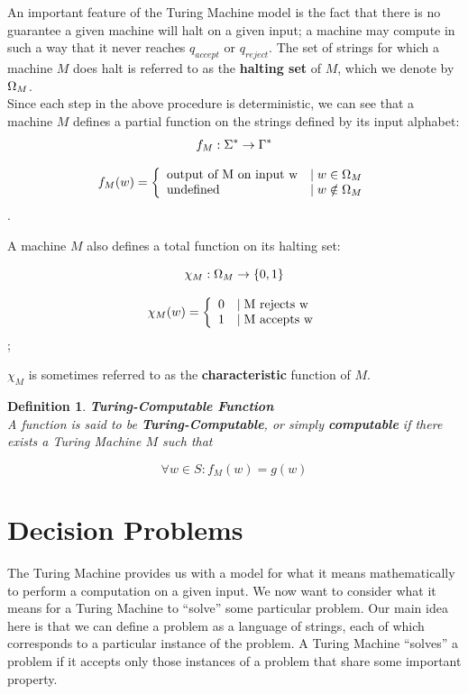 \documentclass{article}
\newtheorem{definition}{Definition}[section]
\begin{document}
An important feature of the Turing Machine model is the fact that
there is no guarantee a given machine will halt on a given input; a
machine may compute in such a way that it never reaches $q_{accept}$
or $q_{reject}$. The set of strings for which a machine $M$ does halt
is referred to as the \textbf{halting set} of $M$, which we denote
by $\Omega_M$.\\

Since each step in the above procedure is deterministic, we can see
that a machine $M$ defines a partial function on the strings
defined by its input alphabet:
$$f_M:\Sigma^* \rightarrow \Gamma^*$$

$$f_M(w) = \left\{ \begin{array}{ll} \textnormal{output of M on input w} & \mid w \in \Omega_M \\ \textnormal{undefined} & \mid w \notin \Omega_M \end{array} \right.$$.
\newline

A machine $M$ also defines a total function on its halting set:

$$\chi_M:\Omega_M \rightarrow \{0,1\}$$

$$\chi_M(w) = \left\{ \begin{array}{ll} 0 & \mid \textnormal{M rejects w} \\ 1 & \mid \textnormal{M accepts w} \end{array} \right.$$;

$\chi_M$ is sometimes referred to as the \textbf{characteristic} function of $M$.\\

\begin{definition}{\textbf{Turing-Computable Function}}\\

  A function  is said to be
  \textbf{Turing-Computable}, or simply \textbf{computable} if there
  exists a Turing Machine $M$ such that
  
  $$\forall w \in S: f_M(w) = g(w)$$
  
\end{definition}


\section{Decision Problems}

The Turing Machine provides us with a model for what it means
mathematically to perform a computation on a given input.  We now
want to consider what it means for a Turing Machine to ``solve''
some particular problem.  Our main idea here is that we can define a
problem as a language of strings, each of which corresponds to a
particular instance of the problem.  A Turing Machine ``solves'' a
problem if it accepts only those instances of a problem that share
some important property.
\end{document}
